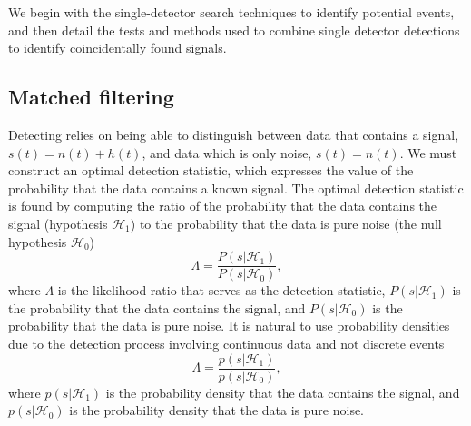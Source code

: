 We begin with the single-detector search techniques to identify potential \gwadj events, and then detail the tests and methods used to combine single detector detections to identify coincidentally found \gwadj signals.

\subsection{\label{2:sec:matched-filter}Matched filtering}

Detecting \gws relies on being able to distinguish between data that contains a \gwadj signal, \( s(t) = n(t) + h(t) \), and data which is only noise, \( s(t) = n(t) \). We must construct an optimal detection statistic, which expresses the value of the probability that the data contains a known signal. The optimal detection statistic is found by computing the ratio of the probability that the data contains the signal (hypothesis $\mathcal{H}_{1}$) to the probability that the data is pure noise (the null hypothesis $\mathcal{H}_{0}$)
%
\begin{equation}
    \Lambda = \frac{P(s|\mathcal{H}_{1})}{P(s|\mathcal{H}_{0})},
\end{equation}
%
where \( \Lambda \) is the likelihood ratio that serves as the detection statistic, \( P(s|\mathcal{H}_{1}) \) is the probability that the data contains the signal, and \( P(s|\mathcal{H}_{0}) \) is the probability that the data is pure noise. It is natural to use probability densities due to the detection process involving continuous data and not discrete events
%
\begin{equation}
    \Lambda = \frac{p(s|\mathcal{H}_{1})}{p(s|\mathcal{H}_{0})},
    \label{2:eq:likelihood_ratio}
\end{equation}
%
where \( p(s|\mathcal{H}_{1}) \) is the probability density that the data contains the signal, and \( p(s|\mathcal{H}_{0}) \) is the probability density that the data is pure noise.

